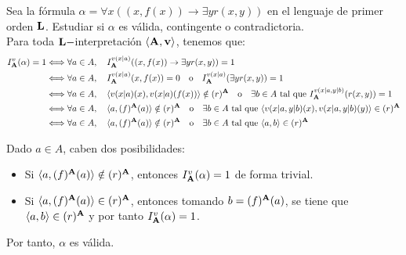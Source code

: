 \begin{ejercicio}
    Sea la fórmula $\alpha=\forall x((x,f(x))\rightarrow\exists yr(x,y))$ en el lenguaje de primer orden $\bf{L}$.
    Estudiar si $\alpha$ es válida, contingente o contradictoria.\\

    Para toda $\bf{L}-$interpretación $\langle \bf{A},v\rangle$, tenemos que:
    \begin{align*}
        I_{\bf{A}}^v(\alpha) = 1
        & \Longleftrightarrow \forall a\in A,\quad  I_{\bf{A}}^{v(x|a)}((x,f(x))\rightarrow\exists yr(x,y))=1\\
        & \Longleftrightarrow \forall a\in A,\quad  I_{\bf{A}}^{v(x|a)}(x,f(x))= 0 \quad\text{o}\quad I_{\bf{A}}^{v(x|a)}(\exists yr(x,y))=1\\
        & \Longleftrightarrow \forall a\in A,\quad  \langle v(x|a)(x),v(x|a)(f(x))\rangle\notin (r)^{\bf{A}} \quad\text{o}\quad \exists b\in A \text{ tal que } I_{\bf{A}}^{v(x|a,y|b)}(r(x,y))=1\\
        & \Longleftrightarrow \forall a\in A,\quad  \langle a,(f)^{\bf{A}}(a)\rangle\notin (r)^{\bf{A}} \quad\text{o}\quad \exists b\in A \text{ tal que } \langle v(x|a,y|b)(x),v(x|a,y|b)(y)\rangle\in (r)^{\bf{A}}\\
        & \Longleftrightarrow \forall a\in A,\quad  \langle a,(f)^{\bf{A}}(a)\rangle\notin (r)^{\bf{A}} \quad\text{o}\quad \exists b\in A \text{ tal que } \langle a,b\rangle\in (r)^{\bf{A}}
    \end{align*}

    Dado $a\in A$, caben dos posibilidades:
    \begin{itemize}
        \item Si $\langle a,(f)^{\bf{A}}(a)\rangle\notin (r)^{\bf{A}}$, entonces $I_{\bf{A}}^v(\alpha)=1$ de forma trivial.
        \item Si $\langle a,(f)^{\bf{A}}(a)\rangle\in (r)^{\bf{A}}$, entonces tomando $b=(f)^{\bf{A}}(a)$, se tiene que $\langle a,b\rangle\in (r)^{\bf{A}}$ y por tanto $I_{\bf{A}}^v(\alpha)=1$.
    \end{itemize}

    Por tanto, $\alpha$ es válida.
\end{ejercicio}



